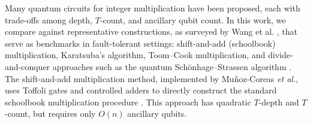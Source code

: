 \documentclass[reprint,amsmath,amssymb,aps,pra]{revtex4-2}
\begin{document}
\begin{table}[t]
    \centering
    \caption{Concrete (non-asymptotic, tight upper-bounded) resource costs for quantum multiplication algorithms. `--' indicates no concrete metric was provided.}
    \label{table:compare}
\end{table}

Many quantum circuits for integer multiplication have been proposed, each with
trade-offs among depth, $T$-count, and ancillary qubit count. In this work, we
compare against representative constructions, as surveyed by Wang et al. \cite{wang2024comprehensivestudyquantumarithmetic}, that serve as benchmarks in
fault-tolerant settings: shift-and-add (schoolbook) multiplication, Karatsuba's
algorithm, Toom–Cook multiplication, and divide-and-conquer approaches such as
the quantum Schönhage–Strassen algorithm
\cite{Munoz-Coreas2019, parent2017improvedreversiblequantumcircuits,
Putranto2023, Nie2023}. The shift-and-add multiplication method, implemented by Muñoz-Coreas \emph{et
al.}, uses Toffoli gates and controlled adders to directly construct the
standard schoolbook multiplication procedure \cite{Munoz-Coreas2019}. This
approach has quadratic $T$-depth and $T$-count, but requires only $O(n)$
ancillary qubits.
\end{document}
